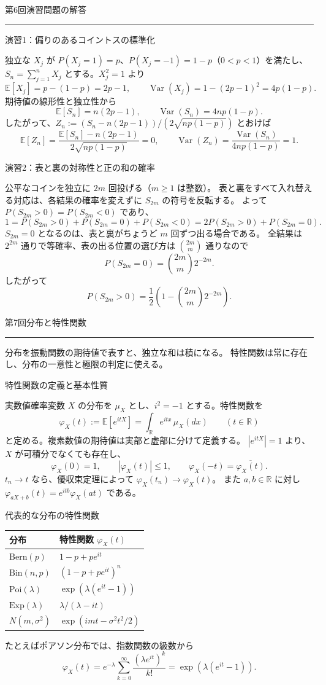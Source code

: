 \documentclass[a4paper,10pt,pdflatex,ja=standard,jafont=ipaex-type1,
  magstyle=real,scale=1]{bxjsarticle}
\newcommand{\coursename}{確率論と統計学 I}
\newcommand{\topic}[1]{\par\vspace{5pt}
  {\large\sffamily\mdseries\color{accent}#1}\par\vspace{2pt}}
\newcommand{\handouttitle}[1]{%
  \begin{center}
    {\Large\color{ink}#1}\par\vspace{3mm}
    {\color{accent}\rule{0.88\linewidth}{0.7pt}}
  \end{center}\vspace{-2mm}}
\newcommand{\keybox}[1]{\par\vspace{3pt}\begingroup
  \setlength{\fboxsep}{5pt}
  \colorbox{soft}{\parbox{\dimexpr\linewidth-2\fboxsep\relax}{#1}}%
  \endgroup\par\vspace{2pt}}
\newcommand{\R}{\mathbb R}
\newcommand{\E}{\mathbb E}
\newcommand{\Var}{\operatorname{Var}}
\begin{document}
\fontsize{10pt}{13.5pt}\selectfont
\begingroup
\fancyhead[L]{\small\color{ink}\coursename{}・前回の演習解答}
\handouttitle{第6回\quad 演習問題の解答}

\topic{演習1：偏りのあるコイントスの標準化}
独立な $X_j$ が $P(X_j=1)=p$、$P(X_j=-1)=1-p$（$0<p<1$）を満たし、
$S_n=\sum_{j=1}^nX_j$ とする。$X_j^2=1$ より
$$
 \E[X_j]=p-(1-p)=2p-1,\qquad
 \Var(X_j)=1-(2p-1)^2=4p(1-p).
$$
期待値の線形性と独立性から
$$\E[S_n]=n(2p-1),\qquad \Var(S_n)=4np(1-p).$$
したがって、$Z_n:=(S_n-n(2p-1))/(2\sqrt{np(1-p)})$ とおけば
$$
 \E[Z_n]=\frac{\E[S_n]-n(2p-1)}{2\sqrt{np(1-p)}}=0,\qquad
 \Var(Z_n)=\frac{\Var(S_n)}{4np(1-p)}=1.
$$

\topic{演習2：表と裏の対称性と正の和の確率}
公平なコインを独立に $2m$ 回投げる（$m\ge1$ は整数）。
表と裏をすべて入れ替える対応は、各結果の確率を変えずに $S_{2m}$ の符号を反転する。
よって $P(S_{2m}>0)=P(S_{2m}<0)$ であり、
$$
 1=P(S_{2m}>0)+P(S_{2m}=0)+P(S_{2m}<0)
   =2P(S_{2m}>0)+P(S_{2m}=0).
$$
$S_{2m}=0$ となるのは、表と裏がちょうど $m$ 回ずつ出る場合である。
全結果は $2^{2m}$ 通りで等確率、表の出る位置の選び方は $\binom{2m}{m}$ 通りなので
$$P(S_{2m}=0)=\binom{2m}{m}2^{-2m}.$$
したがって
$$P(S_{2m}>0)=\frac12\left(1-\binom{2m}{m}2^{-2m}\right).$$
\clearpage
\endgroup

\handouttitle{第7回\quad 分布と特性関数}
\keybox{分布を振動関数の期待値で表すと、独立な和は積になる。
特性関数は常に存在し、分布の一意性と極限の判定に使える。}

\topic{特性関数の定義と基本性質}
実数値確率変数 $X$ の分布を $\mu_X$ とし、$i^2=-1$ とする。特性関数を
$$\varphi_X(t):=\E[e^{itX}]=\int_\R e^{itx}\,\mu_X(dx)
 \qquad(t\in\R)$$
と定める。複素数値の期待値は実部と虚部に分けて定義する。
$|e^{itX}|=1$ より、$X$ が可積分でなくても存在し、
$$\varphi_X(0)=1,\qquad |\varphi_X(t)|\le1,\qquad
 \varphi_X(-t)=\overline{\varphi_X(t)}.$$
$t_n\to t$ なら、優収束定理によって $\varphi_X(t_n)\to\varphi_X(t)$。
また $a,b\in\R$ に対し $\varphi_{aX+b}(t)=e^{itb}\varphi_X(at)$ である。

\topic{代表的な分布の特性関数}
\begin{center}
\renewcommand{\arraystretch}{1.6}
\begin{tabular}{@{}ll@{}}
\toprule
分布 & 特性関数 $\varphi_X(t)$ \\
\midrule
$\mathrm{Bern}(p)$ & $1-p+pe^{it}$ \\
$\mathrm{Bin}(n,p)$ & $(1-p+pe^{it})^n$ \\
$\mathrm{Poi}(\lambda)$ & $\exp(\lambda(e^{it}-1))$ \\
$\mathrm{Exp}(\lambda)$ & $\lambda/(\lambda-it)$ \\
$N(m,\sigma^2)$ & $\exp(imt-\sigma^2t^2/2)$ \\
\bottomrule
\end{tabular}
\end{center}
たとえばポアソン分布では、指数関数の級数から
$$\varphi_X(t)=e^{-\lambda}\sum_{k=0}^\infty
 \frac{(\lambda e^{it})^k}{k!}=\exp(\lambda(e^{it}-1)).$$
\end{document}
